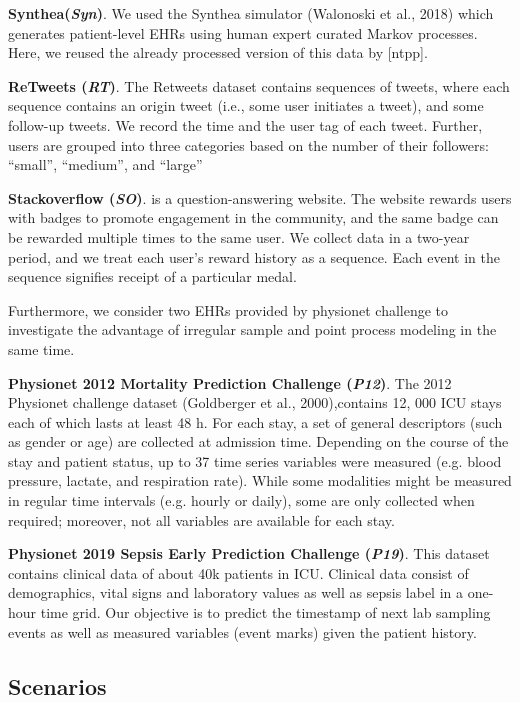 \documentclass[journal,twoside,web]{ieeecolor}
\begin{document}
\textbf{Synthea(\emph{Syn})}.
We used the Synthea simulator (Walonoski et al., 2018) which generates patient-level EHRs using human expert curated Markov processes. Here, we reused the already processed version of this data by [ntpp].

\textbf{ReTweets (\emph{RT})}.
The Retweets dataset contains sequences of tweets, where each sequence contains an origin tweet (i.e., some user initiates a tweet), and some follow-up tweets. We record the time and the user tag of each tweet. Further, users are grouped into three categories based on the number of their followers: “small”, “medium”, and “large”

\textbf{Stackoverflow (\emph{SO})}.
is a question-answering website. The website rewards users with badges to promote engagement in the community, and the same badge can be rewarded multiple times to the same user. We collect data in a two-year period, and we treat each user’s reward history as a sequence. Each event in the sequence signifies receipt of a particular medal.

Furthermore, we consider two EHRs provided by physionet challenge to investigate the advantage of irregular sample and point process modeling in the same time.

\textbf{Physionet 2012 Mortality Prediction Challenge (\emph{P12})}.
The 2012 Physionet challenge dataset (Goldberger et al., 2000),contains 12, 000 ICU stays each of which lasts at least 48 h. For each stay, a set of general descriptors (such as gender or age) are collected at admission time. Depending on the course of the stay and patient status, up to 37 time series variables were measured (e.g. blood pressure, lactate, and respiration rate). While some modalities might be measured in regular time intervals (e.g. hourly or daily), some are only collected when required; moreover, not all variables are available for each stay.

\textbf{Physionet 2019 Sepsis Early Prediction Challenge (\emph{P19})}.
This dataset contains clinical data of about 40k patients in ICU. Clinical data consist of demographics, vital signs and laboratory values as well as sepsis label in a one-hour time grid. Our objective is to predict the timestamp of next lab sampling events as well as measured variables (event marks) given the patient history.



\subsection*{Scenarios}
\end{document}
